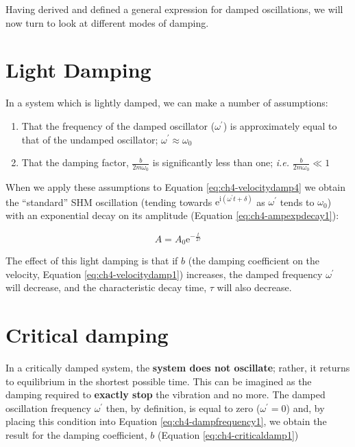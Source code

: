 \documentclass[
]{book}
\providecommand{\tightlist}{%
  \setlength{\itemsep}{0pt}\setlength{\parskip}{0pt}}
\begin{document}
Having derived and defined a general expression for damped oscillations, we will now turn to look at different modes of damping.

\hypertarget{sec-ch4-lightdamping}{%
\section{Light Damping}\label{sec-ch4-lightdamping}}

In a system which is lightly damped, we can make a number of assumptions:

\begin{enumerate}
\def\labelenumi{\arabic{enumi}.}
\tightlist
\item
  That the frequency of the damped oscillator (\(\omega ^\prime\)) is approximately equal to that of the undamped oscillator; \(\omega ^\prime \approx \omega_0\)
\item
  That the damping factor, \(\frac{b}{2m\omega_0}\) is significantly less than one; \emph{i.e.} \(\frac{b}{2m\omega_0} \ll 1\)
\end{enumerate}

When we apply these assumptions to Equation \eqref{eq:ch4-velocitydamp4} we obtain the ``standard'' SHM oscillation (tending towards \(\mathrm{e}^{\mathrm{i}(\omega^\prime t + \delta)}\) as \(\omega ^\prime\) tends to \(\omega_0\)) with an exponential decay on its amplitude (Equation \eqref{eq:ch4-ampexpdecay1}):

\begin{equation}
A = A_0 \mathrm{e}^{-\frac{t}{2\tau}}
\label{eq:ch4-ampexpdecay1}
\end{equation}

The effect of this light damping is that if \(b\) (the damping coefficient on the velocity, Equation \eqref{eq:ch4-velocitydamp1}) increases, the damped frequency \(\omega^\prime\) will decrease, and the characteristic decay time, \(\tau\) will also decrease.

\hypertarget{sec-ch4-criticaldamping}{%
\section{Critical damping}\label{sec-ch4-criticaldamping}}

In a critically damped system, the \textbf{system does not oscillate}; rather, it returns to equilibrium in the shortest possible time. This can be imagined as the damping required to \textbf{exactly stop} the vibration and no more. The damped oscillation frequency \(\omega^\prime\) then, by definition, is equal to zero (\(\omega^\prime = 0\)) and, by placing this condition into Equation \eqref{eq:ch4-dampfrequency1}, we obtain the result for the damping coefficient, \(b\) (Equation \eqref{eq:ch4-criticaldamp1})
\end{document}
